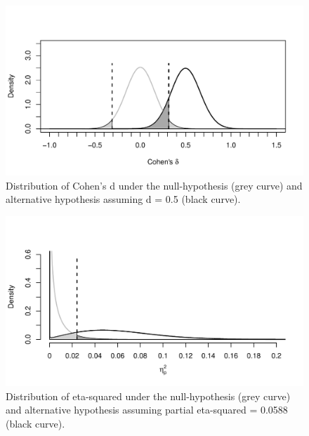 \documentclass[,man,floatsintext]{apa6}
\begin{document}
\begin{figure}
\centering
\includegraphics{0.1_Simulation_Based_Power_Analysis_For_Factorial_ANOVA_Designs_files/figure-latex/d-plot-1.pdf}
\caption{\label{fig:d-plot}Distribution of Cohen's d under the
null-hypothesis (grey curve) and alternative hypothesis assuming d = 0.5
(black curve).}
\end{figure}

\begin{figure}
\centering
\includegraphics{0.1_Simulation_Based_Power_Analysis_For_Factorial_ANOVA_Designs_files/figure-latex/eta-plot-1.pdf}
\caption{\label{fig:eta-plot}Distribution of eta-squared under the
null-hypothesis (grey curve) and alternative hypothesis assuming partial
eta-squared = 0.0588 (black curve).}
\end{figure}
\end{document}
